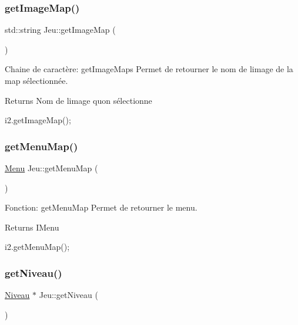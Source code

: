 \subsubsection{\texorpdfstring{get\+Image\+Map()}{getImageMap()}}
{\footnotesize\ttfamily std\+::string Jeu\+::get\+Image\+Map (\begin{DoxyParamCaption}{ }\end{DoxyParamCaption})}



Chaine de caractère\+: get\+Image\+Maps Permet de retourner le nom de l\textquotesingle{}image de la map sélectionnée. 

\begin{DoxyReturn}{Returns}
Nom de l\textquotesingle{}image qu\textquotesingle{}on sélectionne 
\begin{DoxyCode}
i2.getImageMap();
\end{DoxyCode}
 
\end{DoxyReturn}
\mbox{\label{classJeu_a53db67d1ac9622db7f13297e398f2730}} 
\subsubsection{\texorpdfstring{get\+Menu\+Map()}{getMenuMap()}}
{\footnotesize\ttfamily \hyperlink{classMenu}{Menu} Jeu\+::get\+Menu\+Map (\begin{DoxyParamCaption}{ }\end{DoxyParamCaption})}



Fonction\+: get\+Menu\+Map Permet de retourner le menu. 

\begin{DoxyReturn}{Returns}
I\+Menu 
\begin{DoxyCode}
i2.getMenuMap();
\end{DoxyCode}
 
\end{DoxyReturn}
\mbox{\label{classJeu_a71bf0b5329ade330d95318b50d1e2f12}} 
\subsubsection{\texorpdfstring{get\+Niveau()}{getNiveau()}}
{\footnotesize\ttfamily \hyperlink{classNiveau}{Niveau} $\ast$ Jeu\+::get\+Niveau (\begin{DoxyParamCaption}{ }\end{DoxyParamCaption})}




